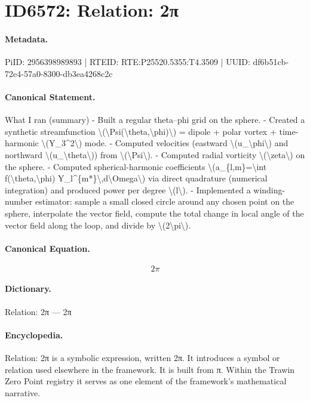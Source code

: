 \section*{ID6572: Relation: 2π}
\paragraph{Metadata.}
PiID: 2956398989893 | RTEID: RTE:P25520.5355:T4.3509 | UUID: df6b51cb-72e4-57a0-8300-db3ea4268c2c

\paragraph{Canonical Statement.}
What I ran (summary) - Built a regular theta–phi grid on the sphere. - Created a synthetic streamfunction \textbackslash{}(\textbackslash{}Psi(\textbackslash{}theta,\textbackslash{}phi)\textbackslash{}) = dipole + polar vortex + time-harmonic \textbackslash{}(Y\_3\textasciicircum{}2\textbackslash{}) mode. - Computed velocities (eastward \textbackslash{}(u\_\textbackslash{}phi\textbackslash{}) and northward \textbackslash{}(u\_\textbackslash{}theta\textbackslash{})) from \textbackslash{}(\textbackslash{}Psi\textbackslash{}). - Computed radial vorticity \textbackslash{}(\textbackslash{}zeta\textbackslash{}) on the sphere. - Computed spherical-harmonic coefficients \textbackslash{}(a\_\{l,m\}=\textbackslash{}int f(\textbackslash{}theta,\textbackslash{}phi) Y\_l\textasciicircum{}\{m*\}\textbackslash{},d\textbackslash{}Omega\textbackslash{}) via direct quadrature (numerical integration) and produced power per degree \textbackslash{}(l\textbackslash{}). - Implemented a winding-number estimator: sample a small closed circle around any chosen point on the sphere, interpolate the vector field, compute the total change in local angle of the vector field along the loop, and divide by \textbackslash{}(2\textbackslash{}pi\textbackslash{}).

\paragraph{Canonical Equation.}
\[
2\pi
\]

\paragraph{Dictionary.}
Relation: 2π — 2π

\paragraph{Encyclopedia.}
Relation: 2π is a symbolic expression, written 2π. It introduces a symbol or relation used elsewhere in the framework. It is built from π. Within the Trawin Zero Point registry it serves as one element of the framework's mathematical narrative.

